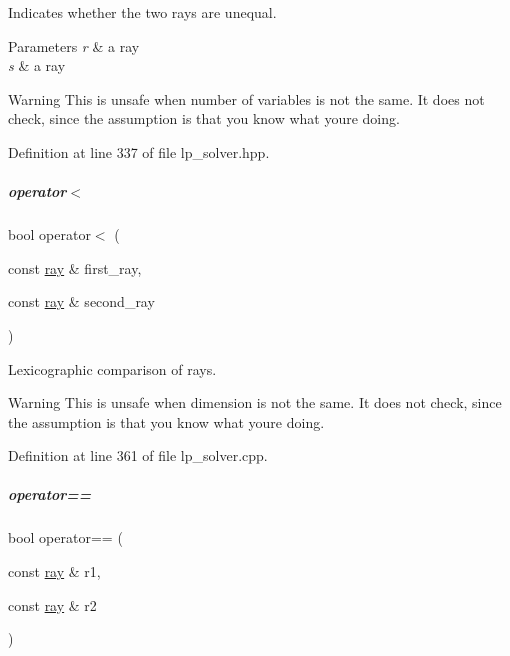 Indicates whether the two rays are unequal. 


\begin{DoxyParams}{Parameters}
{\em r} & a ray \\
\hline
{\em s} & a ray \\
\hline
\end{DoxyParams}
\begin{DoxyWarning}{Warning}
This is unsafe when number of variables is not the same. It does not check, since the assumption is that you know what you\textquotesingle{}re doing. 
\end{DoxyWarning}


Definition at line 337 of file lp\+\_\+solver.\+hpp.

\mbox{\label{group___c_l_s_solvers_a5909f048e7cf014f880adb43da3862d3}} 
\subparagraph{\texorpdfstring{operator$<$}{operator<}}
{\footnotesize\ttfamily bool operator$<$ (\begin{DoxyParamCaption}\item[{const \hyperlink{group___c_l_s_solvers_classray}{ray} \&}]{first\+\_\+ray,  }\item[{const \hyperlink{group___c_l_s_solvers_classray}{ray} \&}]{second\+\_\+ray }\end{DoxyParamCaption})\hspace{0.3cm}{\ttfamily [friend]}}



Lexicographic comparison of rays. 

\begin{DoxyWarning}{Warning}
This is unsafe when dimension is not the same. It does not check, since the assumption is that you know what you\textquotesingle{}re doing. 
\end{DoxyWarning}


Definition at line 361 of file lp\+\_\+solver.\+cpp.

\mbox{\label{group___c_l_s_solvers_ae27bf49e1b2756797f82fea0bf810dfd}} 
\subparagraph{\texorpdfstring{operator==}{operator==}\hspace{0.1cm}{\footnotesize\ttfamily [1/2]}}
{\footnotesize\ttfamily bool operator== (\begin{DoxyParamCaption}\item[{const \hyperlink{group___c_l_s_solvers_classray}{ray} \&}]{r1,  }\item[{const \hyperlink{group___c_l_s_solvers_classray}{ray} \&}]{r2 }\end{DoxyParamCaption})\hspace{0.3cm}{\ttfamily [friend]}}



